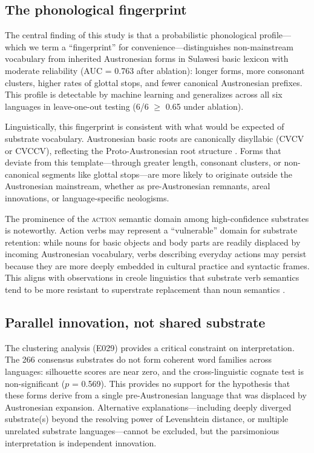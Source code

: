 \documentclass[12pt]{article}
\begin{document}
\subsection{The phonological fingerprint}

The central finding of this study is that a probabilistic phonological profile---which we term a ``fingerprint'' for convenience---distinguishes non-mainstream vocabulary from inherited Austronesian forms in Sulawesi basic lexicon with moderate reliability (AUC = 0.763 after ablation): longer forms, more consonant clusters, higher rates of glottal stops, and fewer canonical Austronesian prefixes.
This profile is detectable by machine learning and generalizes across all six languages in leave-one-out testing (6/6 $\geq$ 0.65 under ablation).

Linguistically, this fingerprint is consistent with what would be expected of substrate vocabulary.
Austronesian basic roots are canonically disyllabic (CVCV or CVCCV), reflecting the Proto-Austronesian root structure \citep{blust2009}.
Forms that deviate from this template---through greater length, consonant clusters, or non-canonical segments like glottal stops---are more likely to originate outside the Austronesian mainstream, whether as pre-Austronesian remnants, areal innovations, or language-specific neologisms.

The prominence of the \textsc{action} semantic domain among high-confidence substrates is noteworthy.
Action verbs may represent a ``vulnerable'' domain for substrate retention: while nouns for basic objects and body parts are readily displaced by incoming Austronesian vocabulary, verbs describing everyday actions may persist because they are more deeply embedded in cultural practice and syntactic frames.
This aligns with observations in creole linguistics that substrate verb semantics tend to be more resistant to superstrate replacement than noun semantics \citep{lefebvre2004, thomason1988}.

\subsection{Parallel innovation, not shared substrate}

The clustering analysis (E029) provides a critical constraint on interpretation.
The 266 consensus substrates do not form coherent word families across languages: silhouette scores are near zero, and the cross-linguistic cognate test is non-significant ($p$ = 0.569).
This provides no support for the hypothesis that these forms derive from a single pre-Austronesian language that was displaced by Austronesian expansion.
Alternative explanations---including deeply diverged substrate(s) beyond the resolving power of Levenshtein distance, or multiple unrelated substrate languages---cannot be excluded, but the parsimonious interpretation is independent innovation.
\end{document}
